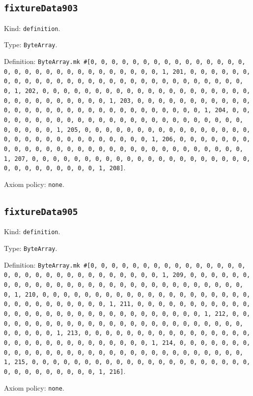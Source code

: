 \documentclass[11pt]{article}
\begin{document}
\subsection*{\texttt{fixtureData903}}
\noindent Kind: \texttt{definition}.\par
\noindent Type: \texttt{ByteArray}.\par
\noindent Definition: \texttt{ByteArray.mk \#[0, 0, 0, 0, 0, 0, 0, 0, 0, 0, 0, 0, 0, 0, 0, 0, 0, 0, 0, 0, 0, 0, 0, 0, 0, 0, 0, 0, 0, 0, 1, 201, 0, 0, 0, 0, 0, 0, 0, 0, 0, 0, 0, 0, 0, 0, 0, 0, 0, 0, 0, 0, 0, 0, 0, 0, 0, 0, 0, 0, 0, 0, 1, 202, 0, 0, 0, 0, 0, 0, 0, 0, 0, 0, 0, 0, 0, 0, 0, 0, 0, 0, 0, 0, 0, 0, 0, 0, 0, 0, 0, 0, 0, 0, 1, 203, 0, 0, 0, 0, 0, 0, 0, 0, 0, 0, 0, 0, 0, 0, 0, 0, 0, 0, 0, 0, 0, 0, 0, 0, 0, 0, 0, 0, 0, 0, 1, 204, 0, 0, 0, 0, 0, 0, 0, 0, 0, 0, 0, 0, 0, 0, 0, 0, 0, 0, 0, 0, 0, 0, 0, 0, 0, 0, 0, 0, 0, 0, 1, 205, 0, 0, 0, 0, 0, 0, 0, 0, 0, 0, 0, 0, 0, 0, 0, 0, 0, 0, 0, 0, 0, 0, 0, 0, 0, 0, 0, 0, 0, 0, 1, 206, 0, 0, 0, 0, 0, 0, 0, 0, 0, 0, 0, 0, 0, 0, 0, 0, 0, 0, 0, 0, 0, 0, 0, 0, 0, 0, 0, 0, 0, 0, 1, 207, 0, 0, 0, 0, 0, 0, 0, 0, 0, 0, 0, 0, 0, 0, 0, 0, 0, 0, 0, 0, 0, 0, 0, 0, 0, 0, 0, 0, 0, 0, 1, 208]}.\par
\noindent Axiom policy: \texttt{none}.\par
\subsection*{\texttt{fixtureData905}}
\noindent Kind: \texttt{definition}.\par
\noindent Type: \texttt{ByteArray}.\par
\noindent Definition: \texttt{ByteArray.mk \#[0, 0, 0, 0, 0, 0, 0, 0, 0, 0, 0, 0, 0, 0, 0, 0, 0, 0, 0, 0, 0, 0, 0, 0, 0, 0, 0, 0, 0, 0, 1, 209, 0, 0, 0, 0, 0, 0, 0, 0, 0, 0, 0, 0, 0, 0, 0, 0, 0, 0, 0, 0, 0, 0, 0, 0, 0, 0, 0, 0, 0, 0, 1, 210, 0, 0, 0, 0, 0, 0, 0, 0, 0, 0, 0, 0, 0, 0, 0, 0, 0, 0, 0, 0, 0, 0, 0, 0, 0, 0, 0, 0, 0, 0, 1, 211, 0, 0, 0, 0, 0, 0, 0, 0, 0, 0, 0, 0, 0, 0, 0, 0, 0, 0, 0, 0, 0, 0, 0, 0, 0, 0, 0, 0, 0, 0, 1, 212, 0, 0, 0, 0, 0, 0, 0, 0, 0, 0, 0, 0, 0, 0, 0, 0, 0, 0, 0, 0, 0, 0, 0, 0, 0, 0, 0, 0, 0, 0, 1, 213, 0, 0, 0, 0, 0, 0, 0, 0, 0, 0, 0, 0, 0, 0, 0, 0, 0, 0, 0, 0, 0, 0, 0, 0, 0, 0, 0, 0, 0, 0, 1, 214, 0, 0, 0, 0, 0, 0, 0, 0, 0, 0, 0, 0, 0, 0, 0, 0, 0, 0, 0, 0, 0, 0, 0, 0, 0, 0, 0, 0, 0, 0, 1, 215, 0, 0, 0, 0, 0, 0, 0, 0, 0, 0, 0, 0, 0, 0, 0, 0, 0, 0, 0, 0, 0, 0, 0, 0, 0, 0, 0, 0, 0, 0, 1, 216]}.\par
\noindent Axiom policy: \texttt{none}.\par
\end{document}
